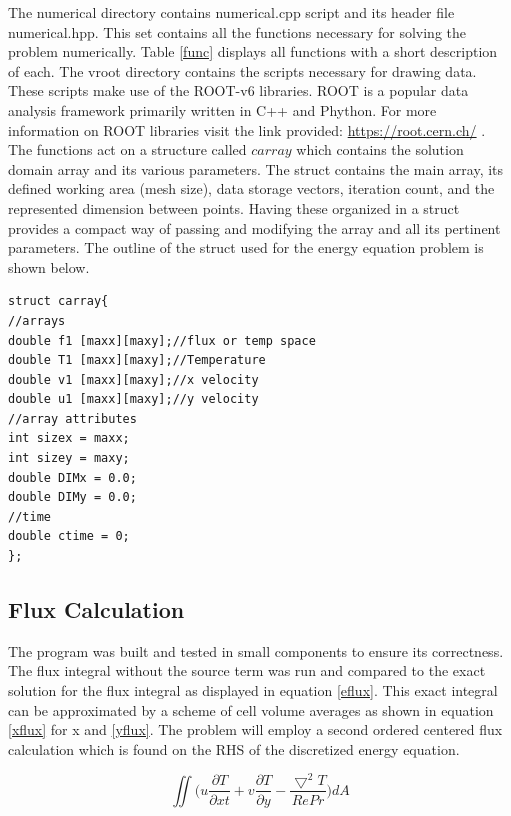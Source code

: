 \documentclass[paper=a4, fontsize=11pt, abstract=on]{scrartcl}
\numberwithin{equation}{section}		%
\numberwithin{figure}{section}			%
\numberwithin{table}{section}				%
\begin{document}
The numerical directory contains numerical.cpp script and its header file numerical.hpp. This set contains all the functions necessary for solving the problem numerically. Table \ref{func} displays all functions with a short description of each. The vroot directory contains the scripts necessary for drawing data. These scripts make use of the ROOT-v6 libraries. ROOT is a popular data analysis framework primarily written in C++ and Phython. For more information on ROOT libraries visit the link provided: \url{https://root.cern.ch/} .
The functions act on a structure called $carray$ which contains the solution domain array and its various parameters. The struct contains the main array, its defined working area (mesh size), data storage vectors, iteration count, and the represented dimension between points. Having these organized in a struct provides a compact way of passing and modifying the array and all its pertinent parameters. The outline of the struct used for the energy equation problem is shown below.

 

\begin{lstlisting}
struct carray{
//arrays
double f1 [maxx][maxy];//flux or temp space
double T1 [maxx][maxy];//Temperature
double v1 [maxx][maxy];//x velocity
double u1 [maxx][maxy];//y velocity
//array attributes
int sizex = maxx;
int sizey = maxy;
double DIMx = 0.0;
double DIMy = 0.0;
//time
double ctime = 0;
};
\end{lstlisting}
 
\subsection{Flux Calculation}


 The program was built and tested in small components to ensure its correctness. The flux integral without the source term was run and compared to the exact solution for the flux integral as displayed in equation \ref{eflux}. This exact integral can be approximated by a scheme of cell volume averages as shown in equation \ref{xflux} for x and \ref{yflux}. The problem will employ a second ordered centered flux calculation which is found on the RHS of the discretized energy equation.


\begin{equation}
\label{eflux}
\iint \Bigg(u\frac{\partial T}{\partial xt} + v\frac{\partial T}{\partial y}-\frac{\bigtriangledown^2T}{Re Pr}\Bigg)dA
\end{equation}
\end{document}
